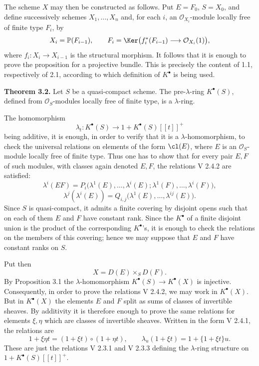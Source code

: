 The scheme \(X\) may then be constructed as follows. Put \(E=F_0\), \(S=X_0\), and define successively schemes \(X_1,\ldots,X_n\) and, for each \(i\), an \(\mathcal O_{X_i}\)-module locally free of finite type \(F_i\), by
\[
  X_i=\mathbb P(F_{i-1}),\qquad
  F_i=\Ker\bigl(f_i^*(F_{i-1})\longrightarrow \mathcal O_{X_i}(1)\bigr),
\]
where \(f_i:X_i\to X_{i-1}\) is the structural morphism. It follows that it is enough to prove the proposition for a projective bundle. This is precisely the content of 1.1, respectively of 2.1, according to which definition of \(K^\bullet\) is being used.

\textbf{Theorem 3.2.} Let \(S\) be a quasi-compact scheme. The pre-\(\lambda\)-ring \(K^\bullet(S)\), defined from \(\mathcal O_S\)-modules locally free of finite type, is a \(\lambda\)-ring.

The homomorphism
\[
  \lambda_t:K^\bullet(S)\longrightarrow 1+K^\bullet(S)[[t]]^+
\]
being additive, it is enough, in order to verify that it is a \(\lambda\)-homomorphism, to check the universal relations on elements of the form \(\cl(E)\), where \(E\) is an \(\mathcal O_S\)-module locally free of finite type. Thus one has to show that for every pair \(E,F\) of such modules, with classes again denoted \(E,F\), the relations V 2.4.2 are satisfied:
\[
  \lambda^i(EF)=P_i\bigl(\lambda^1(E),\ldots,\lambda^i(E);\lambda^1(F),\ldots,\lambda^i(F)\bigr),
\]
\[
  \lambda^j(\lambda^i(E))=Q_{i,j}\bigl(\lambda^1(E),\ldots,\lambda^{ij}(E)\bigr).
\]
Since \(S\) is quasi-compact, it admits a finite covering by disjoint opens such that on each of them \(E\) and \(F\) have constant rank. Since the \(K^\bullet\) of a finite disjoint union is the product of the corresponding \(K^\bullet\)'s, it is enough to check the relations on the members of this covering; hence we may suppose that \(E\) and \(F\) have constant ranks on \(S\).

Put then
\[
  X=D(E)\times_S D(F).
\]
By Proposition 3.1 the \(\lambda\)-homomorphism \(K^\bullet(S)\to K^\bullet(X)\) is injective. Consequently, in order to prove the relations V 2.4.2, we may work in \(K^\bullet(X)\). But in \(K^\bullet(X)\) the elements \(E\) and \(F\) split as sums of classes of invertible sheaves. By additivity it is therefore enough to prove the same relations for elements \(\xi,\eta\) which are classes of invertible sheaves. Written in the form V 2.4.1, the relations are
\[
  1+\xi\eta t=(1+\xi t)\circ(1+\eta t),
  \qquad
  \lambda_u(1+\xi t)=1+\{1+\xi t\}u.
\]
These are just the relations V 2.3.1 and V 2.3.3 defining the \(\lambda\)-ring structure on \(1+K^\bullet(S)[[t]]^+\).

